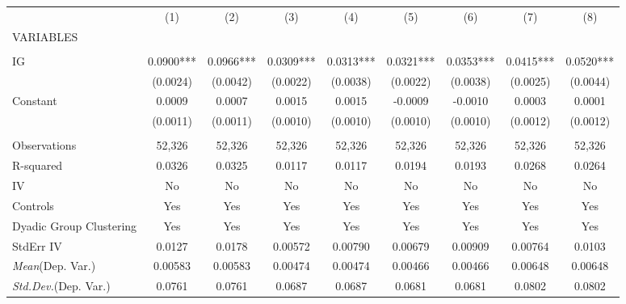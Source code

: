 \documentclass[]{article}
\begin{document}
\begin{tabular}{lcccccccc} \hline
 & (1) & (2) & (3) & (4) & (5) & (6) & (7) & (8) \\
VARIABLES &  &  &  &  &  &  &  &  \\ \hline
 &  &  &  &  &  &  &  &  \\
IG & 0.0900*** & 0.0966*** & 0.0309*** & 0.0313*** & 0.0321*** & 0.0353*** & 0.0415*** & 0.0520*** \\
 & (0.0024) & (0.0042) & (0.0022) & (0.0038) & (0.0022) & (0.0038) & (0.0025) & (0.0044) \\
Constant & 0.0009 & 0.0007 & 0.0015 & 0.0015 & -0.0009 & -0.0010 & 0.0003 & 0.0001 \\
 & (0.0011) & (0.0011) & (0.0010) & (0.0010) & (0.0010) & (0.0010) & (0.0012) & (0.0012) \\
 &  &  &  &  &  &  &  &  \\
Observations & 52,326 & 52,326 & 52,326 & 52,326 & 52,326 & 52,326 & 52,326 & 52,326 \\
R-squared & 0.0326 & 0.0325 & 0.0117 & 0.0117 & 0.0194 & 0.0193 & 0.0268 & 0.0264 \\
IV & No & No & No & No & No & No & No & No \\
Controls & Yes & Yes & Yes & Yes & Yes & Yes & Yes & Yes \\
Dyadic Group Clustering & Yes & Yes & Yes & Yes & Yes & Yes & Yes & Yes \\
StdErr IV & 0.0127 & 0.0178 & 0.00572 & 0.00790 & 0.00679 & 0.00909 & 0.00764 & 0.0103 \\
\textit{Mean}(Dep. Var.) & 0.00583 & 0.00583 & 0.00474 & 0.00474 & 0.00466 & 0.00466 & 0.00648 & 0.00648 \\
 \textit{Std.Dev.}(Dep. Var.) & 0.0761 & 0.0761 & 0.0687 & 0.0687 & 0.0681 & 0.0681 & 0.0802 & 0.0802 \\ \hline
\end{tabular}
\end{document}
